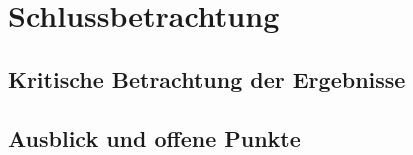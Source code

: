 \chapter{Schlussbetrachtung}
\section{Kritische Betrachtung der Ergebnisse}
\section{Ausblick und offene Punkte}
